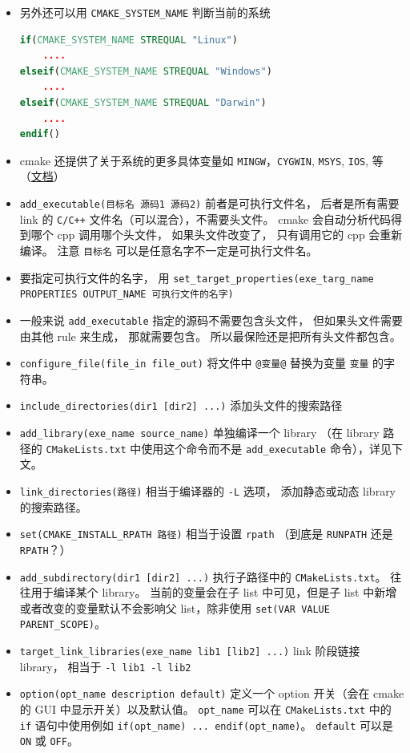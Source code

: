 \begin{itemize}
\begin{lstlisting}[language=cmake]
\end{lstlisting}
\item 另外还可以用 \verb`CMAKE_SYSTEM_NAME` 判断当前的系统
\begin{lstlisting}[language=cmake]
if(CMAKE_SYSTEM_NAME STREQUAL "Linux")
    ....
elseif(CMAKE_SYSTEM_NAME STREQUAL "Windows")
    ....
elseif(CMAKE_SYSTEM_NAME STREQUAL "Darwin")
    ....
endif()
\end{lstlisting}
\item cmake 还提供了关于系统的更多具体变量如 \verb`MINGW`，\verb`CYGWIN`, \verb`MSYS`, \verb`IOS`, 等（\href{https://cmake.org/cmake/help/latest/manual/cmake-variables.7.html}{文档}）
\item \verb`add_executable(目标名 源码1 源码2)` 前者是可执行文件名， 后者是所有需要 link 的 \verb`C/C++` 文件名（可以混合），不需要头文件。 cmake 会自动分析代码得到哪个 cpp 调用哪个头文件， 如果头文件改变了， 只有调用它的 cpp 会重新编译。 注意 \verb`目标名` 可以是任意名字不一定是可执行文件名。
\item 要指定可执行文件的名字， 用 \verb`set_target_properties(exe_targ_name PROPERTIES OUTPUT_NAME 可执行文件的名字)`
\item 一般来说 \verb`add_executable` 指定的源码不需要包含头文件， 但如果头文件需要由其他 rule 来生成， 那就需要包含。 所以最保险还是把所有头文件都包含。
\item \verb`configure_file(file_in file_out)` 将文件中 \verb`@变量@` 替换为变量 \verb`变量` 的字符串。
\item \verb`include_directories(dir1 [dir2] ...)` 添加头文件的搜索路径
\item \verb`add_library(exe_name source_name)` 单独编译一个 library （在 library 路径的 \verb`CMakeLists.txt` 中使用这个命令而不是 \verb`add_executable` 命令），详见下文。
\item \verb`link_directories(路径)` 相当于编译器的 \verb`-L` 选项， 添加静态或动态 library 的搜索路径。
\item \verb`set(CMAKE_INSTALL_RPATH 路径)` 相当于设置 \verb`rpath` （到底是 \verb`RUNPATH` 还是 \verb`RPATH`？）
\item \verb`add_subdirectory(dir1 [dir2] ...)` 执行子路径中的 \verb`CMakeLists.txt`。 往往用于编译某个 library。 当前的变量会在子 list 中可见，但是子 list 中新增或者改变的变量默认不会影响父 list，除非使用 \verb`set(VAR VALUE PARENT_SCOPE)`。
\item \verb`target_link_libraries(exe_name lib1 [lib2] ...)` link 阶段链接 library， 相当于 \verb`-l lib1 -l lib2`
\item \verb`option(opt_name description default)` 定义一个 option 开关（会在 cmake 的 GUI 中显示开关）以及默认值。 \verb`opt_name` 可以在 \verb`CMakeLists.txt` 中的 \verb`if` 语句中使用例如 \verb`if(opt_name) ... endif(opt_name)`。 \verb`default` 可以是 \verb`ON` 或 \verb`OFF`。

\end{itemize}
